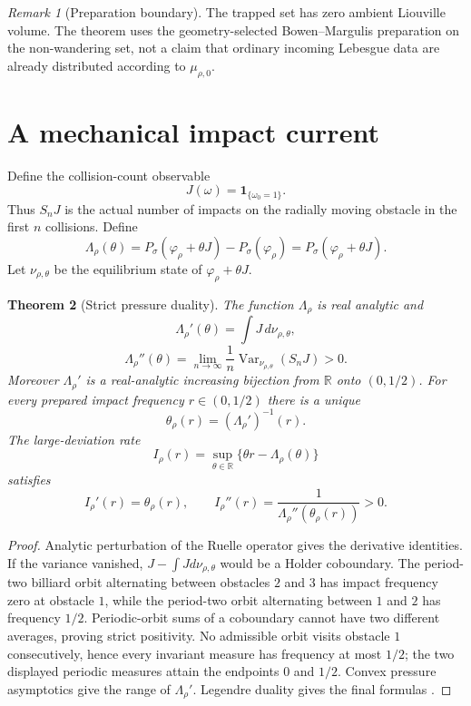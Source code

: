 \documentclass[11pt,reqno]{amsart}
\newtheorem{theorem}{Theorem}[section]
\theoremstyle{definition}
\theoremstyle{remark}
\newtheorem{remark}[theorem]{Remark}
\newcommand{\R}{\mathbb R}
\newcommand{\Var}{\operatorname{Var}}
\begin{document}
\begin{remark}[Preparation boundary]
The trapped set has zero ambient Liouville volume.  The theorem uses the
geometry-selected Bowen--Margulis preparation on the non-wandering set, not a
claim that ordinary incoming Lebesgue data are already distributed according
to $\mu_{\rho,0}$.
\end{remark}

\section{A mechanical impact current}\label{sec:current}
Define the collision-count observable
\[
 J(\omega)=\mathbf1_{\{\omega_0=1\}}.
\]
Thus $S_nJ$ is the actual number of impacts on the radially moving obstacle in
the first $n$ collisions.  Define
\begin{equation}\label{eq:Lambda}
 \Lambda_\rho(\theta)
 =P_\sigma(\varphi_\rho+\theta J)-P_\sigma(\varphi_\rho)
 =P_\sigma(\varphi_\rho+\theta J).
\end{equation}
Let $\nu_{\rho,\theta}$ be the equilibrium state of
$\varphi_\rho+\theta J$.

\begin{theorem}[Strict pressure duality]\label{thm:pressure-duality}
The function $\Lambda_\rho$ is real analytic and
\[
 \Lambda_\rho'(\theta)=\int J\,d\nu_{\rho,\theta},
\]
\[
 \Lambda_\rho''(\theta)
 =\lim_{n\to\infty}\frac1n
 \Var_{\nu_{\rho,\theta}}(S_nJ)>0.
\]
Moreover $\Lambda_\rho'$ is a real-analytic increasing bijection from
$\R$ onto $(0,1/2)$.  For every prepared impact frequency $r\in(0,1/2)$ there
is a unique
\[
 \theta_\rho(r)=(\Lambda_\rho')^{-1}(r).
\]
The large-deviation rate
\[
 I_\rho(r)=\sup_{\theta\in\R}
 \{\theta r-\Lambda_\rho(\theta)\}
\]
satisfies
\[
 I_\rho'(r)=\theta_\rho(r),\qquad
 I_\rho''(r)=\frac1{\Lambda_\rho''(\theta_\rho(r))}>0.
\]
\end{theorem}
\begin{proof}
Analytic perturbation of the Ruelle operator gives the derivative identities.
If the variance vanished, $J-\int Jd\nu_{\rho,\theta}$ would be a Holder
coboundary.  The period-two billiard orbit alternating between obstacles $2$
and $3$ has impact frequency zero at obstacle $1$, while the period-two orbit
alternating between $1$ and $2$ has frequency $1/2$.  Periodic-orbit sums of a
coboundary cannot have two different averages, proving strict positivity.
No admissible orbit visits obstacle $1$ consecutively, hence every invariant
measure has frequency at most $1/2$; the two displayed periodic measures attain
the endpoints $0$ and $1/2$.  Convex pressure asymptotics give the range of
$\Lambda_\rho'$.  Legendre duality gives the final formulas
\cite{Kifer1990,DemboZeitouni1998}.
\end{proof}
\end{document}
